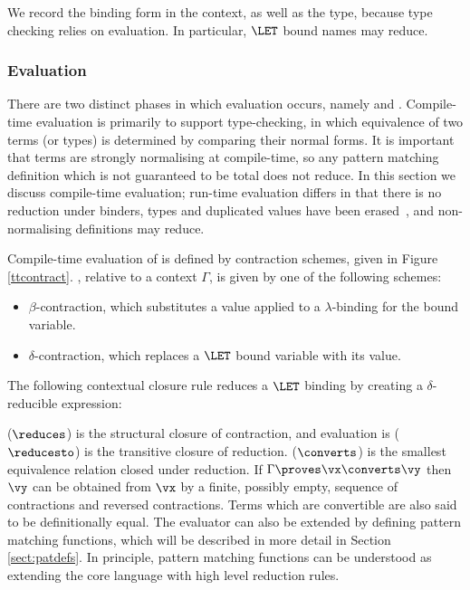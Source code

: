 \noindent
We record the binding form in the context, as well as the type,
because type checking relies on evaluation. In particular, $\LET$ bound
names may reduce.

\subsubsection{Evaluation}

\label{sect:evaluation}

There are two distinct phases in which \TT{} evaluation occurs, namely
 and . Compile-time evaluation is primarily
to support type-checking, in which equivalence of two terms (or types) is
determined by comparing their normal forms. It is important that terms are
strongly normalising at compile-time, so any pattern matching definition which
is not guaranteed to be total does not reduce. In this section we discuss
compile-time evaluation; run-time evaluation differs in that there is no
reduction under binders, types and duplicated values have been
erased~\cite{Brady2003}, and non-normalising definitions may reduce. 

Compile-time evaluation of \TT{} is defined by contraction schemes, given in
Figure \ref{ttcontract}. , relative to a context $\Gamma$,
is given by one of the following schemes:

\begin{itemize}
\item $\beta$-contraction, which substitutes a value applied to a $\lambda$-binding for
the bound variable. 
\item $\delta$-contraction, which replaces a $\LET$ bound variable with its value.
\end{itemize}

\noindent
The following contextual closure rule reduces a $\LET$ binding by creating
a $\delta$-reducible expression:


 ($\reduces$) is the structural closure of contraction, and evaluation
is ($\reducesto$) is the transitive closure of reduction.  ($\converts$)
is the smallest equivalence relation closed under reduction. If $\Gamma\proves\vx\converts\vy$
then $\vy$ can be obtained from $\vx$ by a finite, possibly empty, sequence of
contractions and reversed contractions. Terms which are convertible are also said to
be definitionally equal.
The evaluator can also be extended by defining pattern matching functions, which
will be described in more detail in Section \ref{sect:patdefs}. In principle, pattern
matching functions can be understood as extending the core language with high level
reduction rules.

